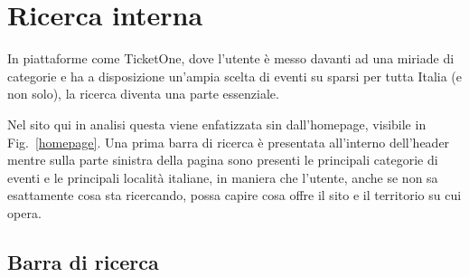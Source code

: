 \section{Ricerca interna}\label{ricerca}

In piattaforme come TicketOne, dove l'utente è messo davanti ad una miriade di categorie e ha a disposizione un'ampia scelta di eventi su sparsi per tutta Italia (e non solo), la ricerca diventa una parte essenziale.
\par Nel sito qui in analisi questa viene enfatizzata sin dall'homepage, visibile in Fig.~\ref{homepage}.
Una prima barra di ricerca è presentata all'interno dell'header mentre sulla parte sinistra della pagina sono presenti le principali categorie di eventi e le principali località italiane, in maniera che l'utente, anche se non sa esattamente cosa sta ricercando, possa capire cosa offre il sito e il territorio su cui opera.

\subsection{Barra di ricerca}

